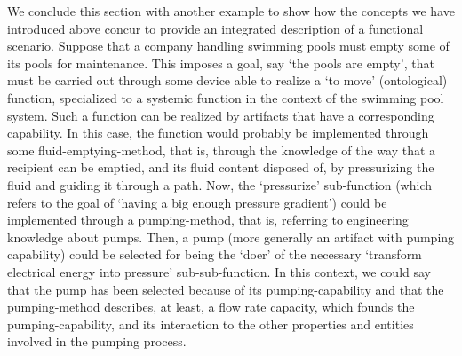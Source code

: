 \documentclass[sw]{iosart2x}
\newcommand{\firstTimeKeyWord}[1]{\textit{#1}}
\newcommand{\myComment}[1]{{\unskip \ignorespaces}}
\begin{document}
\medskip
We conclude this section with another example to show how the concepts we have introduced above concur to provide an integrated description of a functional scenario.\myComment{\footnote{Notice again the similarity with the work of Kitamura, Sasajima, Mizoguchi et al. \cite{kitamuraOntologybasedDescriptionFunctional2003}.}} Suppose that a company handling swimming pools must empty some of its pools for maintenance. This imposes a goal, say `the pools are empty', that must be carried out through some device able to realize a `to move' (ontological) function, specialized to a systemic function in the context of the swimming pool system.
Such a function can be realized by artifacts that have a corresponding capability. In this case, the function would probably be implemented through some fluid-emptying-method, that is, through the knowledge of the way that a recipient can be emptied, and its fluid content disposed of, by pressurizing the fluid and guiding it through a path.
Now, the `pressurize' sub-function (which refers to the goal of `having a big enough pressure gradient') could be implemented through a pumping-method, that is, referring to engineering knowledge about pumps.
Then, a pump (more generally an artifact with pumping capability) could be selected for being the `doer' of the necessary `transform electrical energy into pressure' sub-sub-function.
In this context, we could say that the pump has been selected because of its pumping-capability and that the pumping-method describes, at least, a flow rate capacity, which founds the pumping-capability, and its interaction to the other properties and entities involved in the pumping process. 






\end{document}
